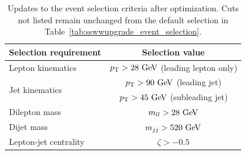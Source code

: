 \begin{table}[htb]
  \centering
  \begin{tabular}{l|c}
    Selection requirement              & Selection value \\
    \hline\hline
    Lepton kinematics                  & $\pt > 28\gev$ (leading lepton only) \\
    \multirow{2}{*}{Jet kinematics}    & $\pt > 90\gev$ (leading jet) \\
                                       & $\pt > 45\gev$ (subleading jet) \\
    \hline
    Dilepton mass                      & $m_{ll} > 28\gev$ \\
    Dijet mass                         & $m_{jj} > 520\gev$ \\
    Lepton-jet centrality              & $\zeta > -0.5$ \\
    \hline
  \end{tabular}
  \caption{Updates to the \ssww event selection criteria after optimization.  Cuts not listed remain unchanged from the default selection in Table~\ref{tab:sswwupgrade_event_selection}.}
  \label{tab:sswwupgrade_optimized_selection}
\end{table}

